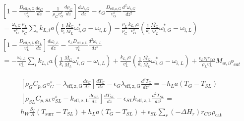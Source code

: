 \documentclass{article}
\begin{document}
\begin{equation}
	\begin{split}
	&\left[1 - \frac{D_{\mathrm{eff,z,G}}}{v_G^s}\frac{d \epsilon_G}{dz} -\frac{1}{\rho_Gv_G^s}\frac{d\rho_G}{dz}\right]\frac{d\omega_{i,G}}{dz} - \epsilon_G \frac{D_{\mathrm{eff,z,G}}}{v_G^s}\frac{d^2\omega_{i,G}}{dz^2} \\
	&=\frac{\omega_{i,G}}{v_G^s}\frac{\rho_L}{\rho_G}\sum_ik_{L,i}a(\frac{1}{k_i}\frac{\overline{M_G}}{\overline{M_L}}\omega_{i,G}^*-\omega_{i,L})  - \frac{\rho_L}{\rho_G}\frac{k_{L,i}a}{v_G^s}(\frac{1}{k_i}\frac{\overline{M_G}}{\overline{M_L}}\omega_{i,G}^*-\omega_{i,L})\\
	&\left[1 -  \frac{D_{\mathrm{eff,z,L}}}{v_L^s}\frac{d\epsilon_L}{dz} \right]\frac{d\omega_{i,L}}{dz} - \frac{\epsilon_L D_{\mathrm{eff,z,L}}}{v_L^s}\frac{d^2\omega_{i,L}}{dz^2} \\
	&= - \frac{\omega_{i,L}}{v_L^s}\sum_ik_{L,i}a(\frac{1}{k_i}\frac{\overline{M_G}}{\overline{M_L}}\omega_{i,G}^*-\omega_{i,L}) + \frac{k_{L,i}a}{v_L^s}(\frac{1}{k_i}\frac{\overline{M_G}}{\overline{M_L}}\omega_{i,G}^*-\omega_{i,L}) + \frac{\epsilon_L \nu_i r_{CO}}{\rho_L v_L^s}M_{w,i}\rho_{cat}
	\end{split}
\end{equation}


\begin{equation}
	\begin{split}
	&\left[\rho_G C_{p,G} v_G^s - \lambda_{\mathrm{eff,z,G}}\frac{d\epsilon_G}{dz} \right]\frac{dT_G}{dz} - \epsilon_G \lambda_{\mathrm{eff,z,G}}\frac{d^2T_G}{dz^2} =- h_L a (T_G - T_{SL}) \\
		&\left[\rho_{SL}C_{p,SL}v_{SL}^s -k_{\mathrm{eff,z,L}}\frac{d \epsilon_{SL}}{dz}\right]\frac{d T_{SL}}{dz} - \epsilon_{SL}k_{\mathrm{eff,z,L}}\frac{d^2T_{SL}}{dz^2} =\\
	& h_W\frac{S_I}{A}(T_{\mathrm{surr}}-T_{SL}) + h_L a (T_G - T_{SL}) + \epsilon_{SL}\sum_r (-\Delta H_r)r_{CO}\rho_{\mathrm{cat}}
	\end{split}
\end{equation}


 
\end{document}
